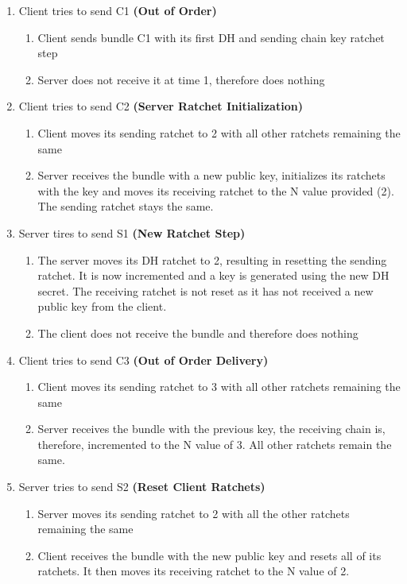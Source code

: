 \begin{enumerate}
    \item Client tries to send C1 \textbf{(Out of Order)}
    \begin{enumerate}
        \item Client sends bundle C1 with its first DH and sending chain key ratchet step
        \item Server does not receive it at time 1, therefore does nothing
    \end{enumerate}
    
    \item Client tries to send C2 \textbf{(Server Ratchet Initialization)}
    \begin{enumerate}
        \item Client moves its sending ratchet to 2 with all other ratchets remaining the same
        \item Server receives the bundle with a new public key, initializes its ratchets with the key and moves its receiving ratchet to the N value provided (2). The sending ratchet stays the same.
    \end{enumerate}

    \item Server tires to send S1 \textbf{(New Ratchet Step)}
    \begin{enumerate}
        \item The server moves its DH ratchet to 2, resulting in resetting the sending ratchet. It is now incremented and a key is generated using the new DH secret. The receiving ratchet is not reset as it has not received a new public key from the client.
        \item The client does not receive the bundle and therefore does nothing
    \end{enumerate}
    
    \item Client tries to send C3 \textbf{(Out of Order Delivery)}
    \begin{enumerate}
        \item Client moves its sending ratchet to 3 with all other ratchets remaining the same
        \item Server receives the bundle with the previous key, the receiving chain is, therefore, incremented to the N value of 3. All other ratchets remain the same.
    \end{enumerate}

    \item Server tries to send S2 \textbf{(Reset Client Ratchets)}
    \begin{enumerate}
        \item Server moves its sending ratchet to 2 with all the other ratchets remaining the same
        \item Client receives the bundle with the new public key and resets all of its ratchets. It then moves its receiving ratchet to the N value of 2.
    \end{enumerate}


\end{enumerate}
